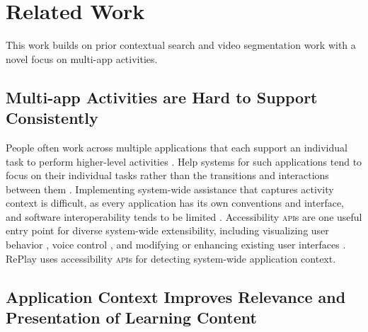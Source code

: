 \section{Related Work}
This work builds on prior contextual search and video segmentation work with a novel focus on multi-app activities.

\subsection{Multi-app Activities are Hard to Support Consistently}
People often work across multiple applications that each support an individual task to perform higher-level activities \cite{Sumner1997}. Help systems for such applications tend to focus on their individual tasks rather than the transitions and interactions between them \cite{Norman2005}. Implementing system-wide assistance that captures activity context is difficult, as every application has its own conventions and interface, and software interoperability tends to be limited \cite{Beaudouin-Lafon2018}. Accessibility \textsc{api}s are one useful entry point for diverse system-wide extensibility, including visualizing user behavior \cite{Matejka2013}, voice control \cite{Li2017, Zhong2014}, and modifying or enhancing existing user interfaces \cite{Dixon2014, Stuerzlinger2006, Chang2011}.
RePlay uses accessibility \textsc{api}s for detecting system-wide application context.

\subsection{Application Context Improves Relevance and Presentation of Learning Content}

